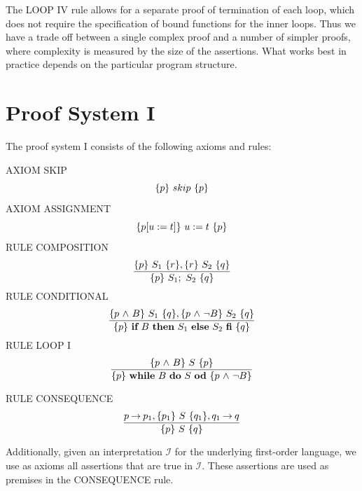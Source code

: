 \documentclass[runningheads]{llncs}       %
\begin{document}
The LOOP IV rule allows for a separate proof of termination of  each loop,  
which does not require the specification of  bound functions
for the  inner loops.
Thus we have a trade off between a single complex proof  and a number of simpler proofs,  where complexity is measured by
the size of the assertions.
What works best in practice depends on the particular program structure.











\appendix

\section{Proof System I}


The proof system I consists of the following axioms and rules:
\VV

\NI
AXIOM \label{rul:skip} SKIP
\[ \mbox{$\{{p}\}\ {skip}\ \{{p}\}$} \]
%
\NI
AXIOM \label{rul:assi} ASSIGNMENT
\[ \mbox{$\{{p[u:=t]}\}\ {u:=t}\ \{{p}\}$} \]
%
\NI
RULE \label{rul:comp} COMPOSITION
\[ \frac{ \mbox{$\{{p}\}\ {S_1}\ \{{r}\}$}, \mbox{$\{{r}\}\ {S_2}\ \{{q}\}$}                }
        { \mbox{$\{{p}\}\ {S_1;\ S_2}\ \{{q}\}$}                          }\]
%
\NI
RULE \label{rul:cond} CONDITIONAL
\[ \frac{ \mbox{$\{{p \mbox{$\ \wedge\ $} B}\}\ {S_1}\ \{{q}\}$}, \mbox{$\{{p \mbox{$\ \wedge\ $} \neg B}\}\ {S_2}\ \{{q}\}$}         }
        { \mbox{$\{{p}\}\ {\mbox{$\mbox{{\bf if}\ } {B} \mbox{\ {\bf then}\ } {S_1} \mbox{\ {\bf else}\ } {S_2}\ \mbox{{\bf fi}}$}}\ \{{q}\}$}                          }\]
%
\NI
RULE \label{rul:loop} LOOP I
\[ \frac{ \mbox{$\{{p \mbox{$\ \wedge\ $} B}\}\ {S}\ \{{p}\}$}                             }
        { \mbox{$\{{p}\}\ {\mbox{$\mbox{{\bf while}\ } {B}\ \mbox{{\bf do}\ } {S}\ \mbox{{\bf od}}$}}\ \{{p \mbox{$\ \wedge\ $} \neg B}\}$}               }\]
%

\NI
RULE \label{rul:cons} CONSEQUENCE
\[ \frac{ p \mbox{$\:\rightarrow\:$} p_1, \mbox{$\{{p_1}\}\ {S}\ \{{q_1}\}$}, q_1 \mbox{$\:\rightarrow\:$} q        }
        { \mbox{$\{{p}\}\ {S}\ \{{q}\}$}                                  }\]
%

Additionally, given an interpretation $\mathcal{I}$ for the underlying first-order language, we use as axioms
all assertions that are true in $\mathcal{I}$. 
These assertions are used as premises in the CONSEQUENCE rule. 
\end{document}
